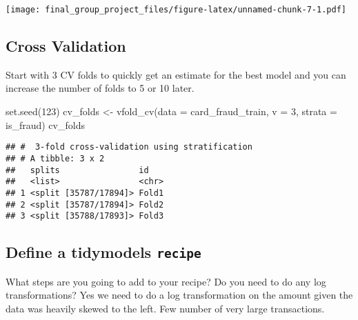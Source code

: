 \documentclass[
]{article}
\newenvironment{Shaded}{\begin{snugshade}}{\end{snugshade}}
\newcommand{\AttributeTok}[1]{\textcolor[rgb]{0.77,0.63,0.00}{#1}}
\newcommand{\DecValTok}[1]{\textcolor[rgb]{0.00,0.00,0.81}{#1}}
\newcommand{\FunctionTok}[1]{\textcolor[rgb]{0.00,0.00,0.00}{#1}}
\newcommand{\NormalTok}[1]{#1}
\newcommand{\OtherTok}[1]{\textcolor[rgb]{0.56,0.35,0.01}{#1}}
\begin{document}
\texttt{[image: final\_group\_project\_files/figure-latex/unnamed-chunk-7-1.pdf]}

\hypertarget{cross-validation}{%
\subsection{Cross Validation}\label{cross-validation}}

Start with 3 CV folds to quickly get an estimate for the best model and
you can increase the number of folds to 5 or 10 later.

\begin{Shaded}
\begin{Highlighting}[]
\FunctionTok{set.seed}\NormalTok{(}\DecValTok{123}\NormalTok{)}
\NormalTok{cv\_folds }\OtherTok{\textless{}{-}} \FunctionTok{vfold\_cv}\NormalTok{(}\AttributeTok{data =}\NormalTok{ card\_fraud\_train, }
                          \AttributeTok{v =} \DecValTok{3}\NormalTok{, }
                          \AttributeTok{strata =}\NormalTok{ is\_fraud)}
\NormalTok{cv\_folds }
\end{Highlighting}
\end{Shaded}

\begin{verbatim}
## #  3-fold cross-validation using stratification 
## # A tibble: 3 x 2
##   splits                id   
##   <list>                <chr>
## 1 <split [35787/17894]> Fold1
## 2 <split [35787/17894]> Fold2
## 3 <split [35788/17893]> Fold3
\end{verbatim}

\hypertarget{define-a-tidymodels-recipe}{%
\subsection{\texorpdfstring{Define a tidymodels
\texttt{recipe}}{Define a tidymodels recipe}}\label{define-a-tidymodels-recipe}}

What steps are you going to add to your recipe? Do you need to do any
log transformations? Yes we need to do a log transformation on the
amount given the data was heavily skewed to the left. Few number of very
large transactions.
\end{document}
